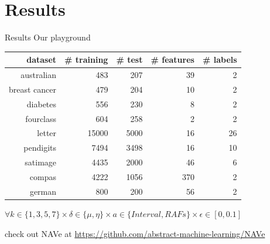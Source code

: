 \documentclass[11pt]{beamer}
\begin{document}
\section{Results}
\begin{frame}{Results}
Our playground
\begin{center}
 \begin{tabular}{r | r r r r}
  dataset       & \# training & \# test & \# features & \# labels \\
  \hline
  australian    &         483 &     207 &          39 &         2 \\
  breast cancer &         479 &     204 &          10 &         2 \\
  diabetes      &         556 &     230 &           8 &         2 \\
  fourclass     &         604 &     258 &           2 &         2 \\
  letter        &       15000 &    5000 &          16 &        26 \\
  pendigits     &        7494 &    3498 &          16 &        10 \\
  satimage      &        4435 &    2000 &          46 &         6 \\
  \hline
  compas        &        4222 &    1056 &         370 &         2 \\
  german        &         800 &     200 &          56 &         2
 \end{tabular}
\end{center}

$\forall k \in \{1, 3, 5, 7\} \times \delta \in \{\mu, \eta\} \times a \in \{Interval, RAFs\} \times \epsilon \in [0, 0.1]$

\begin{center}
 check out NAVe at
 \url{https://github.com/abstract-machine-learning/NAVe}
\end{center}
\end{frame}
\end{document}
